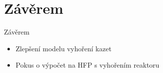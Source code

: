 \documentclass{beamer}
\begin{document}
\section{Závěrem}

\begin{frame}{Závěrem}
	\begin{itemize}
		\item Zlepšení modelu vyhoření kazet 
		\item Pokus o výpočet na HFP s vyhořením reaktoru
	\end{itemize}
\end{frame}
\end{document}
